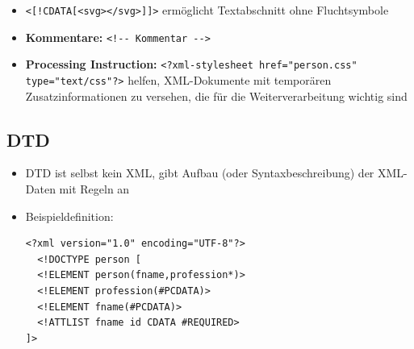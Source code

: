 \documentclass[12pt,landscape]{article}
\begin{document}
\begin{multicols}{3}
\begin{itemize}
\item \lstinline|<[!CDATA[<svg></svg>]]>| ermöglicht Textabschnitt ohne Fluchtsymbole
\item \textbf{Kommentare:} \lstinline|<!-- Kommentar -->|
\item \textbf{Processing Instruction:} \lstinline|<?xml-stylesheet href="person.css" type="text/css"?>| helfen, XML-Dokumente mit temporären Zusatzinformationen zu versehen, die für die Weiterverarbeitung wichtig sind
\end{itemize}
\subsection{DTD}
\begin{itemize}
\item DTD ist selbst kein XML, gibt Aufbau (oder Syntaxbeschreibung) der XML-Daten mit Regeln an
\item Beispieldefinition:
\begin{lstlisting}
<?xml version="1.0" encoding="UTF-8"?>
  <!DOCTYPE person [
  <!ELEMENT person(fname,profession*)>
  <!ELEMENT profession(#PCDATA)>
  <!ELEMENT fname(#PCDATA)>
  <!ATTLIST fname id CDATA #REQUIRED>
]>


\end{lstlisting}
\end{itemize}
\end{multicols}
\end{document}

